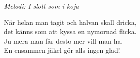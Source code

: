 {\footnotesize\textit{Melodi: I slott som i koja}}\par
\vspace{10pt}
När helan man tagit och halvan skall dricka,\\
det känns som att kyssa en nymornad flicka.\\
Ju mera man får desto mer vill man ha.\\
En ensammen jäkel gör alls ingen glad!
